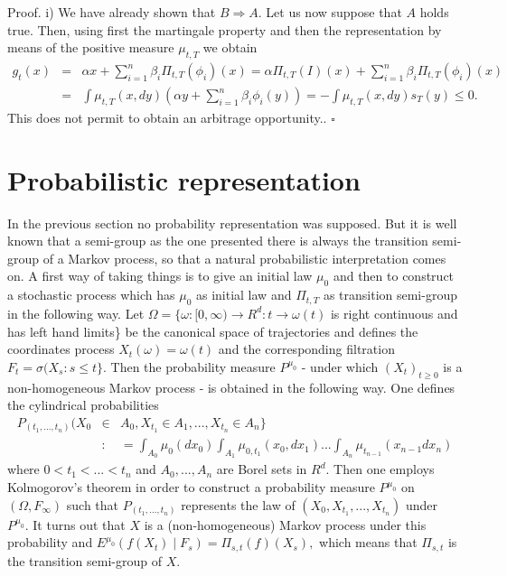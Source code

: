 \documentclass[a4paper]{article}
\begin{document}
Proof. i) We have already shown that $B\Rightarrow A.$ Let us now suppose
that $A$ holds true. Then, using first the martingale property and then the
representation by means of the positive measure $\mu _{t,T}$ we obtain
\begin{eqnarray*}
g_{t}(x) &=&\alpha x+\sum_{i=1}^{n}\beta _{i}\Pi _{t,T}(\phi _{i})(x)=\alpha
\Pi _{t,T}(I)(x)+\sum_{i=1}^{n}\beta _{i}\Pi _{t,T}(\phi _{i})(x) \\
&=&\int \mu _{t,T}(x,dy)(\alpha y+\sum_{i=1}^{n}\beta _{i}\phi
_{i}(y))=-\int \mu _{t,T}(x,dy)s_{T}(y)\leq 0.
\end{eqnarray*}
This does not permit to obtain an arbitrage opportunity.. $\square $

\section{Probabilistic representation}

In the previous section no probability representation was supposed. But it
is well known that a semi-group as the one presented there is always the
transition semi-group of a Markov process, so that a natural probabilistic
interpretation comes on. A first way of taking things is to give an initial
law $\mu _{0}$ and then to construct a stochastic process which has $\mu
_{0} $ as initial law and $\Pi _{t,T}$ as transition semi-group in the
following way. Let $\Omega =\{\omega :[0,\infty )\rightarrow
R^{d}:t\rightarrow \omega (t)$ is right continuous and has left hand
limits\} be the canonical space of trajectories and defines the coordinates
process $X_{t}(\omega )=\omega (t)$ and the corresponding filtration $%
F_{t}=\sigma (X_{s}:s\leq t\}.$ Then the probability measure $P^{\mu _{0}}$
- under which $(X_{t})_{t\geq 0}$ is a non-homogeneous Markov process - is
obtained in the following way. One defines the cylindrical probabilities
\begin{eqnarray*}
P_{(t_{1},...,t_{n})}(X_{0} &\in &A_{0},X_{t_{1}}\in A_{1},...,X_{t_{n}}\in
A_{n}\} \\
&:&=\int_{A_{0}}\mu _{0}(dx_{0})\int_{A_{1}}\mu
_{0,t_{1}}(x_{0},dx_{1})...\int_{A_{n}}\mu _{t_{n-1}}(x_{n-1}dx_{n})
\end{eqnarray*}
where $0<t_{1}<...<t_{n}$ and $A_{0},...,A_{n}$ are Borel sets in $R^{d}.$
Then one employs Kolmogorov's theorem in order to construct a probability
measure $P^{\mu _{0}}$ on $(\Omega ,F_{\infty })$ such that $%
P_{(t_{1},...,t_{n})}$ represents the law of $%
(X_{0},X_{t_{1}},...,X_{t_{n}}) $ under $P^{\mu _{0}}.$ It turns out that $X$
is a (non-homogeneous) Markov process under this probability and $E^{\mu
_{0}}(f(X_{t})\mid F_{s})=\Pi _{s,t}(f)(X_{s}),$ which means that $\Pi _{s,t}
$ is the transition semi-group of $X.$
\end{document}

